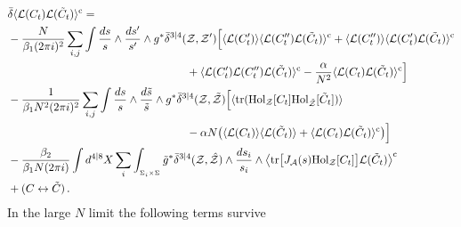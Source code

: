 \documentclass[12pt]{article}
\def \tr {\mathop{\rm tr}\nolimits}
\numberwithin{equation}{section}
\begin{document}
\begin{align}
&\bar{\delta} \langle \mathcal{L}(C_t) \mathcal{L}(\tilde{C}_t)\rangle^{\rm c} = \notag \\
&-\frac{N}{\beta_1 (2 \pi i)^2} \sum_{i,j} \int  \frac{ds}{s} \wedge\frac{ds'}{s'} \wedge g^* \bar{\delta}^{3|4}(\mathcal{Z},\mathcal{Z'})
\Bigl[ \langle \mathcal{L}(C^\prime_t) \rangle \langle \mathcal{L}(C^{\prime \prime}_t) \mathcal{L}(\tilde{C}_t)\rangle^{\rm c} + \langle \mathcal{L}(C^{\prime \prime}_t) \rangle \langle \mathcal{L}(C^{\prime}_t) \mathcal{L}(\tilde{C}_t)\rangle^{\rm c} \notag \\
&\qquad \qquad \qquad \qquad \qquad \qquad \qquad \qquad  + \langle \mathcal{L}(C^\prime_t)  \mathcal{L}(C^{\prime \prime}_t) \mathcal{L}(\tilde{C}_t)\rangle^{\rm c} - \frac{\alpha}{N^2} \langle \mathcal{L}(C_t) \mathcal{L}(\tilde{C}_t)\rangle^{\rm c} \Bigr] \notag \\
&-\frac{1}{\beta_1 N^2 (2 \pi i)^2} \sum_{i,j} \int  \frac{ds}{s} \wedge\frac{d\tilde{s}}{\tilde{s}} \wedge g^* \bar{\delta}^{3|4}(\mathcal{Z},\tilde{\mathcal{Z}})
\Bigl[ \langle \tr ({\rm Hol}_{\mathcal{Z}}[C_t] {\rm Hol}_{\tilde{\mathcal{Z}}}[\tilde{C}_t])\rangle \notag \\
&\qquad \qquad \qquad \qquad \qquad \qquad \qquad \qquad - \alpha N \bigl(\langle \mathcal{L}(C_t) \rangle \langle \mathcal{L}(\tilde{C}_t)\rangle + \langle \mathcal{L}(C_t) \mathcal{L}(\tilde{C}_t)\rangle^{\rm c}\bigr) \Bigr] \notag \\
&-\frac{\beta_2}{\beta_1 N (2 \pi i)} \int d^{4|8}X \sum_i \int_{{}_{\Sigma_i \times \Sigma}} \tilde{g}^* \bar{\delta}^{3|4}(\mathcal{Z},\hat{\mathcal{Z}}) \wedge \frac{ds_i}{s_i} \wedge \big\langle \! \tr \bigl[ J_{\mathcal{A}}(s) {\rm Hol}_{\mathcal{Z}}[C_t] \bigr] \mathcal{L}(\tilde{C}_t)\big\rangle^{\rm c}  \notag \\
&+ (C \leftrightarrow \tilde{C}) \,.
\end{align}
In the large $N$ limit the following terms survive
\end{document}
